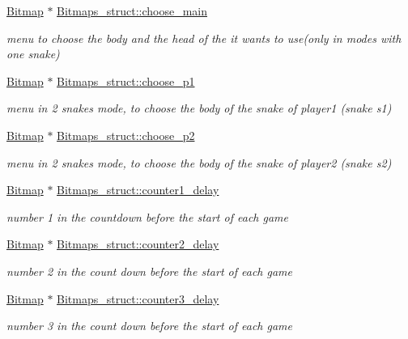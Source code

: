 \begin{DoxyCompactItemize}
\hyperlink{structBitmap}{Bitmap} $\ast$ \hyperlink{group__graphics_ga0fe961b9b328a12b933b0e3d2393e9d4}{Bitmaps\+\_\+struct\+::choose\+\_\+main}
\begin{DoxyCompactList}\small\item\em menu to choose the body and the head of the it wants to use(only in modes with one snake) \end{DoxyCompactList}\item 
\hyperlink{structBitmap}{Bitmap} $\ast$ \hyperlink{group__graphics_ga1c051bf49f7de6f60eb93649684ebfb5}{Bitmaps\+\_\+struct\+::choose\+\_\+p1}
\begin{DoxyCompactList}\small\item\em menu in 2 snakes mode, to choose the body of the snake of player1 (snake s1) \end{DoxyCompactList}\item 
\hyperlink{structBitmap}{Bitmap} $\ast$ \hyperlink{group__graphics_gabe0652c58a65bf0ccd93497ab08d9cfb}{Bitmaps\+\_\+struct\+::choose\+\_\+p2}
\begin{DoxyCompactList}\small\item\em menu in 2 snakes mode, to choose the body of the snake of player2 (snake s2) \end{DoxyCompactList}\item 
\hyperlink{structBitmap}{Bitmap} $\ast$ \hyperlink{group__graphics_ga0d2f0b6ce3ed9e3fbdca9fb0e2197c8f}{Bitmaps\+\_\+struct\+::counter1\+\_\+delay}
\begin{DoxyCompactList}\small\item\em number 1 in the countdown before the start of each game \end{DoxyCompactList}\item 
\hyperlink{structBitmap}{Bitmap} $\ast$ \hyperlink{group__graphics_gabbfd3197d8f58f68356e4c404c9b41a7}{Bitmaps\+\_\+struct\+::counter2\+\_\+delay}
\begin{DoxyCompactList}\small\item\em number 2 in the count down before the start of each game \end{DoxyCompactList}\item 
\hyperlink{structBitmap}{Bitmap} $\ast$ \hyperlink{group__graphics_gac1063b5ae836e49a51d16a672c9cc11f}{Bitmaps\+\_\+struct\+::counter3\+\_\+delay}
\begin{DoxyCompactList}\small\item\em number 3 in the count down before the start of each game \end{DoxyCompactList}\item 

\end{DoxyCompactItemize}
